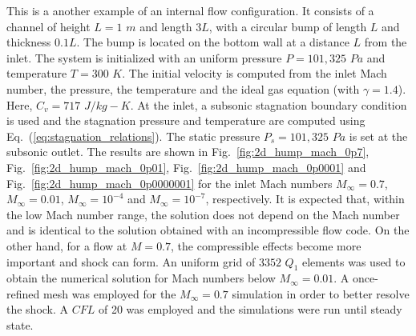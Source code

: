 \documentclass[preprint,10pt]{elsarticle}
\newcommand{\eqt}[1]{Eq.~(\ref{#1})}                     %
\newcommand{\fig}[1]{Fig.~\ref{#1}}                      %
\begin{document}
This is a another example of an internal flow configuration. It consists of a channel of height $L=1$ $m$ and length $3L$, with a circular bump of length $L$ and thickness $0.1L$. The bump is located on the bottom wall at a distance $L$ from the inlet. The system is initialized with an uniform pressure $P=101,325$ $Pa$ and temperature $T=300$ $K$. The initial velocity is computed from the inlet Mach number, the pressure, the temperature and the ideal gas equation (with  $\gamma=1.4$). Here,  $C_v = 717$ $J/kg-K$. At the inlet, a subsonic stagnation boundary condition is used and the stagnation pressure and temperature are computed using \eqt{eq:stagnation_relations}.
The static pressure $P_s = 101,325$ $Pa$ is set at the subsonic outlet. The results are shown in \fig{fig:2d_hump_mach_0p7}, \fig{fig:2d_hump_mach_0p01}, \fig{fig:2d_hump_mach_0p0001} and \fig{fig:2d_hump_mach_0p0000001} for the inlet Mach numbers $M_{\infty}=0.7$, $M_{\infty}=0.01$, $M_{\infty}=10^{-4}$ and $M_{\infty}=10^{-7}$, respectively. It is expected that, within the low Mach number range, the solution does not depend on the Mach number and is identical to the solution obtained with an incompressible flow code. On the other hand, for a flow at $M=0.7$, the compressible effects become more important and shock can form. An uniform grid of $3352$ $Q_1$ elements was used to obtain the numerical solution for Mach numbers below $M_{\infty}=0.01$. A once-refined mesh was employed for the $M_{\infty}=0.7$ simulation in order to better resolve the shock. A $CFL$ of 20 was employed and the simulations were run until steady state.
%
\end{document}
